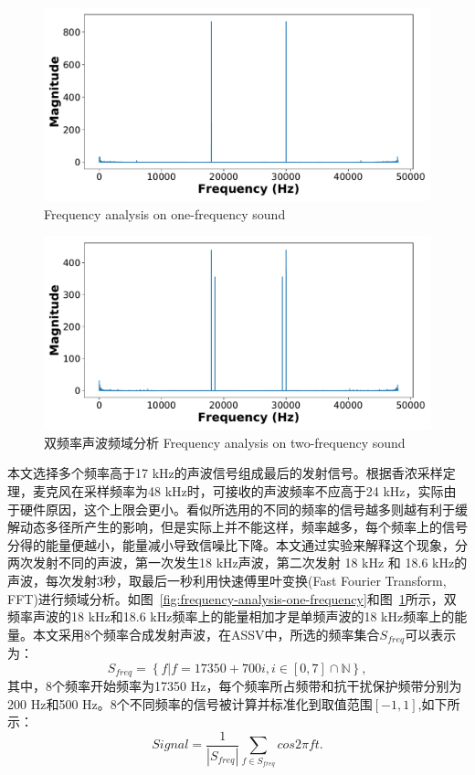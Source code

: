 \begin{figure}
  \centering
  \begin{minipage}[t]{0.49\textwidth}
    \centering
    \includegraphics[width=\textwidth]{figure/one-freq-fft.pdf}
      {Frequency analysis on one-frequency sound}
        \label{fig:frequency-analysis-one-frequency}
  \end{minipage}
  \centering
  \begin{minipage}[t]{0.49\textwidth}
    \centering
    \includegraphics[width=\textwidth]{figure/two-freq-fft.pdf}
    \bicaption
    {双频率声波频域分析}
    {Frequency analysis on two-frequency sound}
    \label{fig:frequency-analysis-two-frequency}
   \end{minipage}
\end{figure}

本文选择多个频率高于17 kHz的声波信号组成最后的发射信号。根据香浓采样定理，麦克风在采样频率为48 kHz时，可接收的声波频率不应高于24 kHz，实际由于硬件原因，这个上限会更小。看似所选用的不同的频率的信号越多则越有利于缓解动态多径所产生的影响，但是实际上并不能这样，频率越多，每个频率上的信号分得的能量便越小，能量减小导致信噪比下降。本文通过实验来解释这个现象，分两次发射不同的声波，第一次发生18 kHz声波，第二次发射 18 kHz 和 18.6 kHz的声波，每次发射3秒，取最后一秒利用快速傅里叶变换(Fast Fourier Transform, FFT)进行频域分析。如图~\ref{fig:frequency-analysis-one-frequency}和图~\ref{fig:frequency-analysis-two-frequency}所示，双频率声波的18 kHz和18.6 kHz频率上的能量相加才是单频声波的18 kHz频率上的能量。本文采用8个频率合成发射声波，在ASSV中，所选的频率集合$S_{freq}$可以表示为：
$$
S_{freq}=  \left\lbrace f | f=17350+700i, i \in \left[ 0,7 \right] \cap \mathbb{N} \right\rbrace,
$$
其中，8个频率开始频率为17350 Hz，每个频率所占频带和抗干扰保护频带分别为200 Hz和500 Hz。8个不同频率的信号被计算并标准化到取值范围$[-1,1]$,如下所示：
$$
Signal=\frac{1}{|S_{freq}|}\sum_{f \in S_{freq}}cos 2\pi ft.
$$

